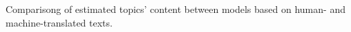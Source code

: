 Comparisong of estimated topics' content between models based on human- and machine-translated texts. \label{fig:topic_content_similarity}

